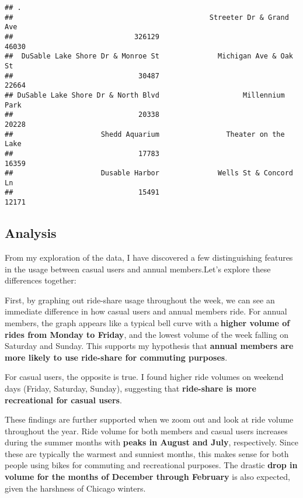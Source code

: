 \documentclass[
]{article}
\begin{document}
\begin{verbatim}
## .
##                                               Streeter Dr & Grand Ave 
##                             326129                              46030 
##  DuSable Lake Shore Dr & Monroe St              Michigan Ave & Oak St 
##                              30487                              22664 
## DuSable Lake Shore Dr & North Blvd                    Millennium Park 
##                              20338                              20228 
##                     Shedd Aquarium                Theater on the Lake 
##                              17783                              16359 
##                     Dusable Harbor              Wells St & Concord Ln 
##                              15491                              12171
\end{verbatim}

\hypertarget{analysis}{%
\subsection{Analysis}\label{analysis}}

From my exploration of the data, I have discovered a few distinguishing
features in the usage between casual users and annual members.Let's
explore these differences together:

First, by graphing out ride-share usage throughout the week, we can see
an immediate difference in how casual users and annual members ride. For
annual members, the graph appears like a typical bell curve with a
\textbf{higher volume of rides from Monday to Friday}, and the lowest
volume of the week falling on Saturday and Sunday. This supports my
hypothesis that \textbf{annual members are more likely to use ride-share
for commuting purposes}.

For casual users, the opposite is true. I found higher ride volumes on
weekend days (Friday, Saturday, Sunday), suggesting that
\textbf{ride-share is more recreational for casual users}.

These findings are further supported when we zoom out and look at ride
volume throughout the year. Ride volume for both members and casual
users increases during the summer months with \textbf{peaks in August
and July}, respectively. Since these are typically the warmest and
sunniest months, this makes sense for both people using bikes for
commuting and recreational purposes. The drastic \textbf{drop in volume
for the months of December through February} is also expected, given the
harshness of Chicago winters.
\end{document}
